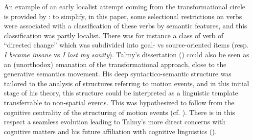 \documentclass[english,output=paper,colorlinks,citecolor=brown]{../langscibook}
\begin{document}
An example of an early localist attempt coming from the transformational circle is provided by \citet{Lakoff1976}: to simplify, in this paper, some selectional restrictions on verbs were associated with a classification of these verbs by semantic features, and this classification was partly localist. There was for instance a class of verb of “directed change” which was subdivided into goal- vs source-oriented items (resp. \textit{I became insane} vs \textit{I lost my sanity}). Talmy’s dissertation (\citeyear{Talmy1972}) could also be seen as an (unorthodox) emanation of the transformational approach, close to the generative semantics movement. His deep syntactico-semantic structure was tailored to the analysis of structures referring to motion events, and in this initial stage of his theory, this structure could be interpreted as a linguistic template transferrable to non-spatial events. This was hypothesized to follow from the cognitive centrality of the structuring of motion events (cf. \citealt[234]{Talmy1975}). There is in this respect a seamless evolution leading to Talmy’s more direct concerns with cognitive matters and his future affiliation with cognitive linguistics (\citealt{FortisVittrant2016}).
\end{document}
